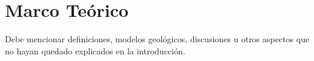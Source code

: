 \setcounter{figure}{0} %
\renewcommand{\thefigure}{\thesection.\arabic{figure}}
\section{\Large Marco Teórico}
Debe mencionar definiciones, modelos geológicos, discusiones u otros aspectos que no hayan quedado explicados en la introducción.\\